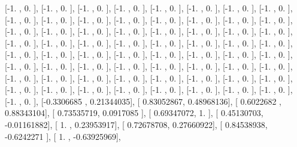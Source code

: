\documentclass{article}
\begin{document}
       [-1.        ,  0.        ],
       [-1.        ,  0.        ],
       [-1.        ,  0.        ],
       [-1.        ,  0.        ],
       [-1.        ,  0.        ],
       [-1.        ,  0.        ],
       [-1.        ,  0.        ],
       [-1.        ,  0.        ],
       [-1.        ,  0.        ],
       [-1.        ,  0.        ],
       [-1.        ,  0.        ],
       [-1.        ,  0.        ],
       [-1.        ,  0.        ],
       [-1.        ,  0.        ],
       [-1.        ,  0.        ],
       [-1.        ,  0.        ],
       [-1.        ,  0.        ],
       [-1.        ,  0.        ],
       [-1.        ,  0.        ],
       [-1.        ,  0.        ],
       [-1.        ,  0.        ],
       [-1.        ,  0.        ],
       [-1.        ,  0.        ],
       [-1.        ,  0.        ],
       [-1.        ,  0.        ],
       [-1.        ,  0.        ],
       [-1.        ,  0.        ],
       [-1.        ,  0.        ],
       [-1.        ,  0.        ],
       [-1.        ,  0.        ],
       [-1.        ,  0.        ],
       [-1.        ,  0.        ],
       [-1.        ,  0.        ],
       [-1.        ,  0.        ],
       [-1.        ,  0.        ],
       [-1.        ,  0.        ],
       [-1.        ,  0.        ],
       [-1.        ,  0.        ],
       [-1.        ,  0.        ],
       [-1.        ,  0.        ],
       [-1.        ,  0.        ],
       [-1.        ,  0.        ],
       [-1.        ,  0.        ],
       [-1.        ,  0.        ],
       [-1.        ,  0.        ],
       [-1.        ,  0.        ],
       [-1.        ,  0.        ],
       [-1.        ,  0.        ],
       [-1.        ,  0.        ],
       [-1.        ,  0.        ],
       [-1.        ,  0.        ],
       [-1.        ,  0.        ],
       [-1.        ,  0.        ],
       [-1.        ,  0.        ],
       [-1.        ,  0.        ],
       [-1.        ,  0.        ],
       [-1.        ,  0.        ],
       [-1.        ,  0.        ],
       [-1.        ,  0.        ],
       [-1.        ,  0.        ],
       [-1.        ,  0.        ],
       [-1.        ,  0.        ],
       [-1.        ,  0.        ],
       [-1.        ,  0.        ],
       [-1.        ,  0.        ],
       [-0.3306685 ,  0.21344035],
       [ 0.83052867,  0.48968136],
       [ 0.6022682 ,  0.88343104],
       [ 0.73535719,  0.0917085 ],
       [ 0.69347072,  1.        ],
       [ 0.45130703, -0.01161882],
       [ 1.        ,  0.23953917],
       [ 0.72678708,  0.27660922],
       [ 0.84538938, -0.6242271 ],
       [ 1.        , -0.63925969],
\end{document}
